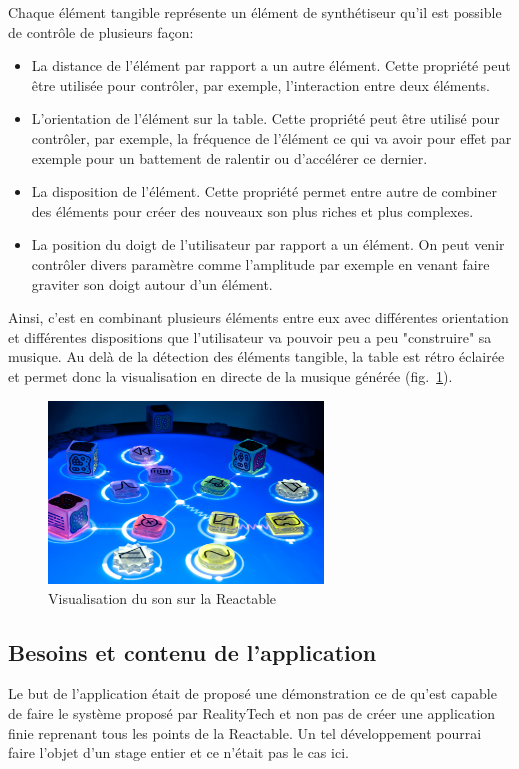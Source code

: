 Chaque élément tangible représente un élément de synthétiseur qu'il est possible de contrôle de plusieurs façon:
\begin{itemize} 
\item La distance de l'élément par rapport a un autre élément. Cette propriété peut être utilisée pour contrôler, par exemple, l'interaction entre deux éléments.
\item L'orientation de l'élément sur la table. Cette propriété peut être utilisé pour contrôler, par exemple, la fréquence de l'élément ce qui va avoir pour effet par exemple pour un battement de ralentir ou d'accélérer ce dernier.
\item La disposition de l'élément. Cette propriété permet entre autre de combiner des éléments pour créer des nouveaux son plus riches et plus complexes.
\item La position du doigt de l'utilisateur par rapport a un élément. On peut venir contrôler divers paramètre comme l'amplitude par exemple en venant faire graviter son doigt autour d'un élément.
\end{itemize}
Ainsi, c'est en combinant plusieurs éléments entre eux avec différentes orientation et différentes dispositions que l'utilisateur va pouvoir peu a peu "construire" sa musique.
Au delà de la détection des éléments tangible, la table est rétro éclairée et permet donc la visualisation en directe de la musique générée (fig.~\ref{fig:reactivsu}).

\begin{figure}[H]
\centering
\includegraphics[width=0.65\textwidth]{images/reactvisu}
\caption{Visualisation du son sur la Reactable\protect\footnotemark}
\label{fig:reactivsu}
\end{figure}



\subsection{Besoins et contenu de l'application}
Le but de l'application était de proposé une démonstration ce de qu'est capable de faire le système proposé par RealityTech et non pas de créer une application finie reprenant tous les points de la Reactable. Un tel développement pourrai faire l'objet d'un stage entier et ce n'était pas le cas ici.

